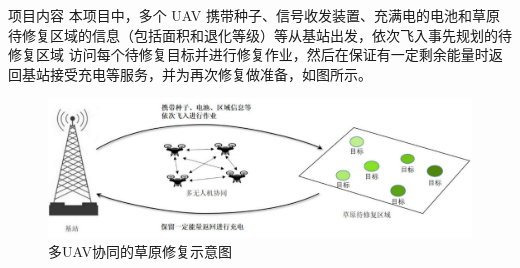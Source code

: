 \documentclass{beamer}
\begin{document}
\begin{frame}{项目内容}
    \quad \quad 本项目中，多个 UAV 携带种子、信号收发装置、充满电的电池和草原待修复区域的信息（包括面积和退化等级）等从基站出发，依次飞入事先规划的待修复区域 访问每个待修复目标并进行修复作业，然后在保证有一定剩余能量时返回基站接受充电等服务，并为再次修复做准备，如图所示。
    
    \begin{figure}[htbp]
		  \centering
            \includegraphics[scale=0.3]{pic/3.png}
            \caption{多UAV协同的草原修复示意图}
    \end{figure}
    
\end{frame}
\end{document}
